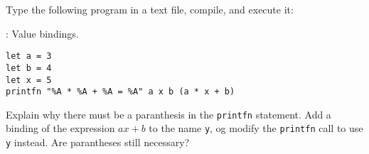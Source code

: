 Type the following program in a text file, compile, and execute it:
  \begin{codeNOutput}[label=linear]{: Value bindings.}
\begin{lstlisting}
let a = 3
let b = 4
let x = 5
printfn "%A * %A + %A = %A" a x b (a * x + b)
\end{lstlisting}
\end{codeNOutput}
Explain why there must be a paranthesis in the \lstinline!printfn!
statement. Add a binding of the expression $ax+b$ to the name
\lstinline!y!, og modify the \lstinline!printfn! call to use
\lstinline!y! instead. Are parantheses still necessary?
